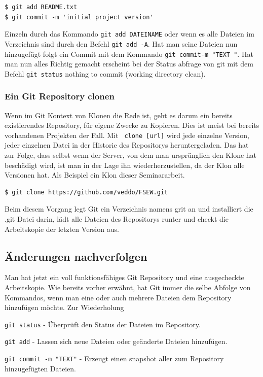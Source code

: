 \documentclass[12pt,a4paper,bibliography=totocnumbered,listof=totocnumbered]{scrartcl}
\begin{document}
 \vspace{1em}
\begin{lstlisting}[caption=Git Repository Dateien hinzufügen, label=lst:arduino]
$ git add README.txt
$ git commit -m 'initial project version'

\end{lstlisting}


Einzeln durch das Kommando \lstinline|git add DATEINAME| oder wenn es alle Dateien im Verzeichnis sind durch den Befehl \lstinline|git add -A|. Hat man seine Dateien nun hinzugefügt folgt ein Commit mit dem Kommando \lstinline|git commit-m "TEXT "|. Hat man nun alles Richtig gemacht erscheint bei der Status abfrage von git mit dem Befehl \lstinline|git status| nothing to commit (working directory clean).


\subsubsection{Ein Git Repository clonen}
Wenn im Git Kontext von Klonen die Rede ist, geht es darum ein bereits existierendes Repository, für eigene Zwecke zu Kopieren. Dies ist meist bei bereits vorhandenen Projekten der Fall. Mit \lstinline| clone [url]| wird jede einzelne Version, jeder einzelnen Datei in der Historie des Repositorys heruntergeladen. Das hat zur Folge, dass selbst wenn der Server, von dem man ursprünglich den Klone hat beschädigt wird, ist man in der Lage ihn wiederherzustellen, da der Klon alle Versionen hat. Als Beispiel ein Klon dieser Seminararbeit.

    \vspace{1em}
\begin{lstlisting}[caption=Git Repository Klonen, label=lst:arduino]
$ git clone https://github.com/veddo/FSEW.git
\end{lstlisting}

Beim diesem Vorgang legt Git ein Verzeichnis namens grit an und installiert die .git Datei darin, lädt alle Dateien des Repositorys runter und checkt die Arbeitskopie der letzten Version aus.




\subsection{ Änderungen nachverfolgen}
Man hat jetzt ein voll funktionsfähiges Git Repository und eine ausgecheckte Arbeitskopie.  Wie bereits vorher erwähnt, hat Git immer die selbe Abfolge von Kommandos, wenn man eine oder auch mehrere Dateien dem Repository hinzufügen möchte. Zur Wiederholung
\begin{compactitem}
	\item \lstinline|git status| - Überprüft den Status der Dateien im Repository.
	\item \lstinline|git add| - Lassen sich neue Dateien oder geänderte Dateien hinzufügen. 
	\item \lstinline|git commit -m "TEXT"| - Erzeugt einen snapshot aller zum Repository hinzugefügten Dateien.
\end{compactitem}
\end{document}
